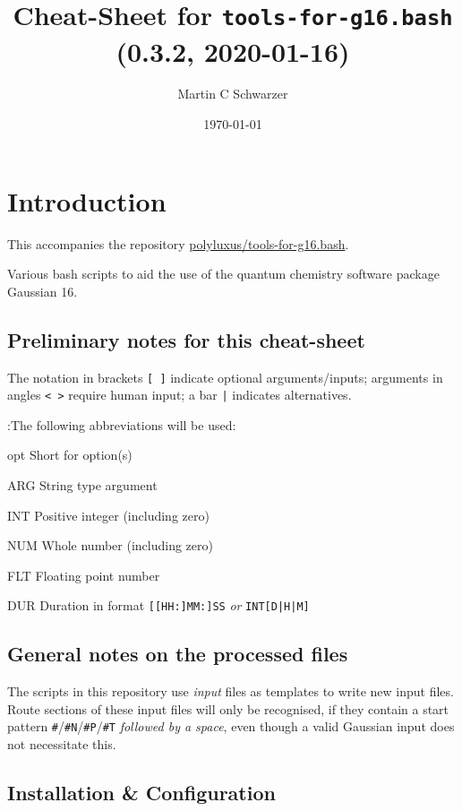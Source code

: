 \documentclass[final, a4paper, columns=3, margin=1.0cm, 10pt]{refcard}
\title{Cheat-Sheet for \texttt{tools-for-g16.bash} (0.3.2, 2020-01-16)}
\author{Martin C Schwarzer}
\date{\today}
\begin{document}
\maketitle

\section{Introduction}

This accompanies the repository \href{https://github.com/polyluxus/tools-for-g16.bash}{polyluxus/tools-for-g16.bash}.

Various bash scripts to aid the use of the quantum chemistry software package Gaussian 16.

\subsection{Preliminary notes for this cheat-sheet}

The notation in brackets \texttt{[ ]} indicate optional arguments/inputs;
arguments in angles \texttt{< >} require human input;
a bar \texttt{|} indicates alternatives.

:The following abbreviations will be used:
\begin{refcardlist}[labelfont=\ttfamily]
  \item[opt] Short for option(s)
  \item[ARG] String type argument
  \item[INT] Positive integer (including zero)
  \item[NUM] Whole number (including zero)
  \item[FLT] Floating point number
  \item[DUR] Duration in format \texttt{[[HH:]MM:]SS} \emph{or} \texttt{INT[D|H|M]}
\end{refcardlist}

\subsection{General notes on the processed files}

The scripts in this repository use \emph{input} files as templates to write new input files.
Route sections of these input files will only be recognised, 
if they contain a start pattern \texttt{\#}/\texttt{\#N}/\texttt{\#P}/\texttt{\#T}
\emph{followed by a space}, even though a valid Gaussian input does not necessitate this.

\subsection{Installation \& Configuration}
\end{document}
